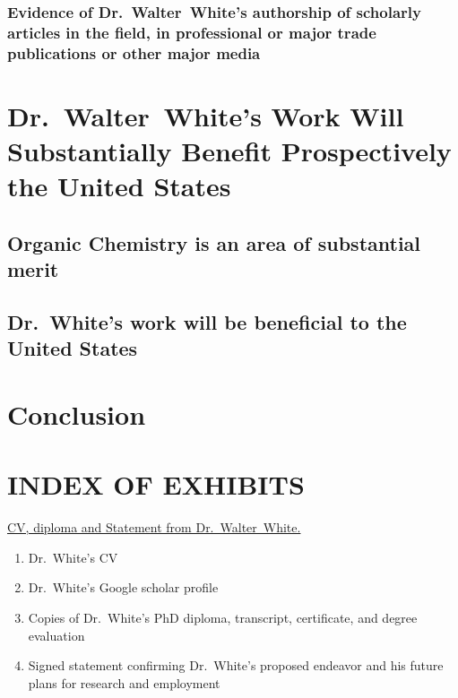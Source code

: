 \documentclass{article}
\newcommand{\fname}{Walter}
\newcommand{\lname}{White}
\newcommand{\dr}{Dr.~\fname~\lname}
\newcommand{\drfn}{Dr.~\lname}
\newcommand{\oc}{Organic Chemistry}
\begin{document}
\pagebreak
\subsubsection{
    Evidence of \dr's authorship of scholarly articles in the field,
    in professional or major trade publications or other major media
}\label{sec:scholarly-articles}
\lipsum[1-1]


\section{
    \dr's Work Will Substantially Benefit Prospectively the United States
}\label{sec:beneficial-to-us}


\subsection{\oc{} is an area of substantial merit}
\lipsum[1-1]

\subsection{\drfn's work will be beneficial to the United States}
\lipsum[1-1]


\section{Conclusion}



\pagebreak
\section{INDEX OF EXHIBITS}



\underline{CV, diploma and Statement from \dr.}
\begin{enumerate}
    \item \drfn's CV \label{exh:cv}
    \item \drfn's Google scholar profile \label{exh:google-scholar}
    \item Copies of \drfn's PhD diploma, transcript, certificate, and degree evaluation \label{exh:diploma}
    \item Signed statement confirming \drfn's proposed endeavor and his future plans for research and employment\label{exh:statement}
\end{enumerate}
\end{document}

